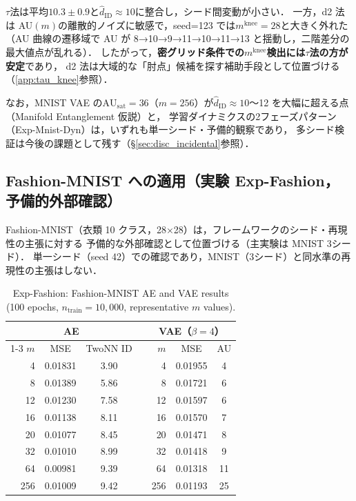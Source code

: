 \documentclass[11pt,a4paper]{jsarticle}
\newcommand{\AUsat}{\mathrm{AU}_{\mathrm{sat}}}
\newcommand{\mknee}{m^{\mathrm{knee}}}
\begin{document}
$\tau$法は平均$10.3 \pm 0.9$と$\hat{d}_\mathrm{ID} \approx 10$に整合し，シード間変動が小さい．
一方，d2 法は AU$(m)$の離散的ノイズに敏感で，seed=123 では$\mknee = 28$と大きく外れた
（AU 曲線の遷移域で AU が 8→10→9→11→10→11→13 と揺動し，二階差分の最大値点が乱れる）．
したがって，\textbf{密グリッド条件での$\mknee$検出には$\tau$法の方が安定}であり，
d2 法は大域的な「肘点」候補を探す補助手段として位置づける（\ref{app:tau_knee}参照）．

なお，MNIST VAE の$\AUsat = 36$（$m=256$）が$\hat{d}_\mathrm{ID} \approx 10$〜12 を大幅に超える点（Manifold Entanglement 仮説）と，
学習ダイナミクスの2フェーズパターン（Exp-Mnist-Dyn）は，いずれも単一シード・予備的観察であり，
多シード検証は今後の課題として残す（§\ref{sec:disc_incidental}参照）．

\subsection{Fashion-MNIST への適用（実験 Exp-Fashion，予備的外部確認）}\label{sec:exp_fashion}

Fashion-MNIST（衣類 10 クラス，28×28）は，フレームワークのシード・再現性の主張に対する
予備的な外部確認として位置づける（主実験は MNIST 3シード）．
単一シード（seed 42）での確認であり，MNIST（3シード）と同水準の再現性の主張はしない．

\begin{table}[H]
\centering
\caption{Exp-Fashion: Fashion-MNIST AE and VAE results (100 epochs, $n_\mathrm{train}=10{,}000$, representative $m$ values).}
\label{tab:ef}
\small
\begin{tabular}{rcccrcc}
\toprule
\multicolumn{3}{c}{AE} & \phantom{xx} & \multicolumn{3}{c}{VAE（$\beta=4$）} \\
\cmidrule{1-3}\cmidrule{5-7}
$m$ & MSE & TwoNN ID && $m$ & MSE & AU \\
\midrule
 4  & 0.01831 & 3.90 && 4  & 0.01955 & 4  \\
 8  & 0.01389 & 5.86 && 8  & 0.01721 & 6  \\
12  & 0.01230 & 7.58 && 12 & 0.01597 & 6  \\
16  & 0.01138 & 8.11 && 16 & 0.01570 & 7  \\
20  & 0.01077 & 8.45 && 20 & 0.01471 & 8  \\
32  & 0.01010 & 8.99 && 32 & 0.01418 & 9  \\
64  & 0.00981 & 9.39 && 64 & 0.01318 & 11 \\
256 & 0.01009 & 9.42 && 256& 0.01193 & 25 \\
\bottomrule
\end{tabular}
\end{table}
\end{document}
